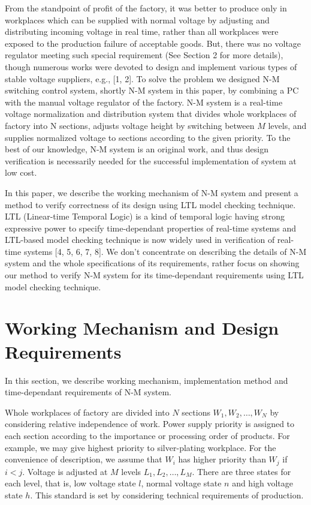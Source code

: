 \documentclass[runningheads,a4paper]{llncs}
\begin{document}
From the standpoint of profit of the factory, it was better to produce only in workplaces which can be supplied with normal voltage by adjusting and distributing incoming voltage in real time, rather than all workplaces were exposed to the production failure of acceptable goods. But, there was no voltage regulator meeting such special requirement (See Section 2 for more details), though numerous works were devoted to design and implement various types of stable voltage suppliers, e.g., [1, 2]. To solve the problem we designed N-M switching control system, shortly N-M system in this paper, by combining a PC with the manual voltage regulator of the factory.
N-M system is a real-time voltage normalization and distribution system that divides whole workplaces of factory into N sections, adjusts voltage height by switching between $M$ levels, and supplies normalized voltage to sections according to the given priority. To the best of our knowledge, N-M system is an original work, and thus design verification is necessarily needed for the successful implementation of system at low cost. 

In this paper, we describe the working mechanism of N-M system and present a method to verify correctness of its design using LTL model checking technique. LTL (Linear-time Temporal Logic) is a kind of temporal logic having strong expressive power to specify time-dependant properties of real-time systems and LTL-based model checking technique is now widely used in verification of real-time systems [4, 5, 6, 7, 8]. We don’t concentrate on describing the details of N-M system and the whole specifications of its requirements, rather focus on showing our method to verify N-M system for its time-dependant requirements using LTL model checking technique. 

\section{Working Mechanism and Design Requirements}

In this section, we describe working mechanism, implementation method and time-dependant requirements of N-M system.

Whole workplaces of factory are divided into $N$ sections $W_1, W_2 , \ldots, W_N$ by considering relative independence of work. Power supply priority is assigned to each section according to the importance or processing order of products. For example, we may give highest priority to silver-plating workplace. For the convenience of description, we assume that $W_i$ has higher priority than $W_j$ if $i<j$. Voltage is adjusted at $M$ levels $L_1, L_2 , \ldots, L_M$. There are three states for each level, that is, low voltage state $l$, normal voltage state $n$ and high voltage state $h$. This standard is set by considering technical requirements of production.
\end{document}
